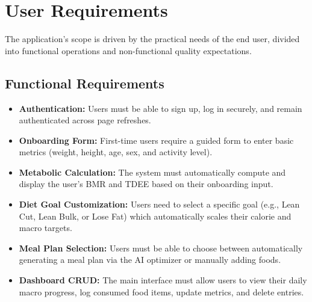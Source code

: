 \section{User Requirements}

The application's scope is driven by the practical needs of the end user, divided into functional 
operations and non-functional quality expectations.

\subsection{Functional Requirements}
\begin{itemize}
    \item \textbf{Authentication:} Users must be able to sign up, log in securely, and 
    remain authenticated across page refreshes.
    \item \textbf{Onboarding Form:} First-time users require a guided form to enter basic 
    metrics (weight, height, age, sex, and activity level).
    \item \textbf{Metabolic Calculation:} The system must automatically compute and display 
    the user's BMR and TDEE based on their onboarding input.
    \item \textbf{Diet Goal Customization:} Users need to select a specific goal 
    (e.g., Lean Cut, Lean Bulk, or Lose Fat) which automatically scales their calorie and 
    macro targets.
    \item \textbf{Meal Plan Selection:} Users must be able to choose between automatically 
    generating a meal plan via the AI optimizer or manually adding foods.
    \item \textbf{Dashboard CRUD:} The main interface must allow users to view their daily 
    macro progress, log consumed food items, update metrics, and delete entries.
\end{itemize}

